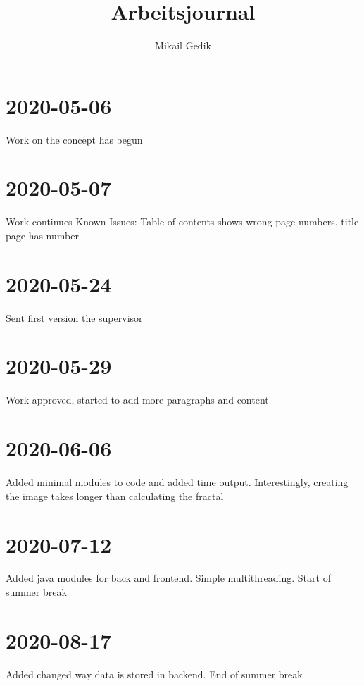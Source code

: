 \documentclass[10pt,a4paper]{article}
\author{Mikail Gedik}
\title{Arbeitsjournal}
\begin{document}
	\maketitle
	\section{2020-05-06}
	Work on the concept has begun
	\section{2020-05-07}
	Work continues\newline
	Known Issues: Table of contents shows wrong page numbers, title page has number
	\section{2020-05-24}
	Sent first version the supervisor
	\section{2020-05-29}
	Work approved, started to add more paragraphs and content
	\section{2020-06-06}
	Added minimal modules to code and added time output. Interestingly, creating the image takes longer than calculating the fractal
	\section{2020-07-12}
	Added java modules for back and frontend. Simple multithreading. Start of summer break
	\section{2020-08-17}
	Added changed way data is stored in backend. End of summer break
\end{document}
